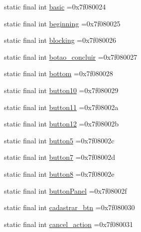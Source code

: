 \begin{DoxyCompactItemize}
static final int \mbox{\hyperlink{classbr_1_1unb_1_1cic_1_1mp_1_1marketmaster_1_1R_1_1id_a0aa303196c0f9ac4ee1d1db942402063}{basic}} =0x7f080024
\item 
static final int \mbox{\hyperlink{classbr_1_1unb_1_1cic_1_1mp_1_1marketmaster_1_1R_1_1id_aabb1b9bd2b991201ab1c0eda719f9370}{beginning}} =0x7f080025
\item 
static final int \mbox{\hyperlink{classbr_1_1unb_1_1cic_1_1mp_1_1marketmaster_1_1R_1_1id_a76072b0d3448f505eddea336b245f69c}{blocking}} =0x7f080026
\item 
static final int \mbox{\hyperlink{classbr_1_1unb_1_1cic_1_1mp_1_1marketmaster_1_1R_1_1id_abc8af358d2b5c80d36e95529268f7233}{botao\+\_\+concluir}} =0x7f080027
\item 
static final int \mbox{\hyperlink{classbr_1_1unb_1_1cic_1_1mp_1_1marketmaster_1_1R_1_1id_a6a613c0acd355e3e24492a09589f079b}{bottom}} =0x7f080028
\item 
static final int \mbox{\hyperlink{classbr_1_1unb_1_1cic_1_1mp_1_1marketmaster_1_1R_1_1id_a8215716a3443fc4ed7bcd0bdaaf5f9cb}{button10}} =0x7f080029
\item 
static final int \mbox{\hyperlink{classbr_1_1unb_1_1cic_1_1mp_1_1marketmaster_1_1R_1_1id_a9fc21f4cf5161782738da0d20aa86c3c}{button11}} =0x7f08002a
\item 
static final int \mbox{\hyperlink{classbr_1_1unb_1_1cic_1_1mp_1_1marketmaster_1_1R_1_1id_a84e7d7fb46629b18ef44a7beb2d8b7fe}{button12}} =0x7f08002b
\item 
static final int \mbox{\hyperlink{classbr_1_1unb_1_1cic_1_1mp_1_1marketmaster_1_1R_1_1id_aec960e77e1c81bdaa23e8a54712b89cf}{button5}} =0x7f08002c
\item 
static final int \mbox{\hyperlink{classbr_1_1unb_1_1cic_1_1mp_1_1marketmaster_1_1R_1_1id_aad2eb900059d148680cfdcb9cf47cfc6}{button7}} =0x7f08002d
\item 
static final int \mbox{\hyperlink{classbr_1_1unb_1_1cic_1_1mp_1_1marketmaster_1_1R_1_1id_a0c91e3723ff03a655c89d721bc02a628}{button8}} =0x7f08002e
\item 
static final int \mbox{\hyperlink{classbr_1_1unb_1_1cic_1_1mp_1_1marketmaster_1_1R_1_1id_a3c3364301ed45c9ed080ebf558894621}{button\+Panel}} =0x7f08002f
\item 
static final int \mbox{\hyperlink{classbr_1_1unb_1_1cic_1_1mp_1_1marketmaster_1_1R_1_1id_aa2ffa884f025aeeb4bbdebad07a85d44}{cadastrar\+\_\+btn}} =0x7f080030
\item 
static final int \mbox{\hyperlink{classbr_1_1unb_1_1cic_1_1mp_1_1marketmaster_1_1R_1_1id_a0703e11ca01deb019eb1f682bd5b48fd}{cancel\+\_\+action}} =0x7f080031

\end{DoxyCompactItemize}
